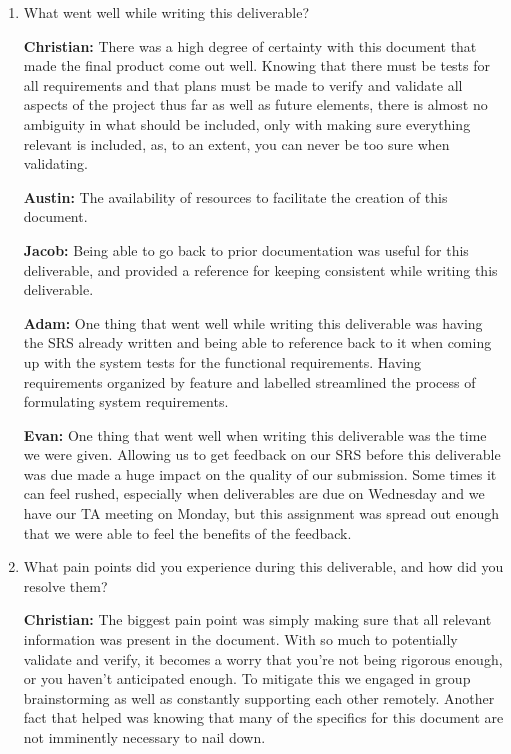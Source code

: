 \documentclass[12pt, titlepage]{article}
\begin{document}
\begin{enumerate}
  \item What went well while writing this deliverable? 

  \textbf{Christian:} There was a high degree of certainty with this document that made the final product come out well. Knowing that there must be tests for all requirements and that plans must be made to verify and validate all aspects of the project thus far as well as future elements, there is almost no ambiguity in what should be included, only with making sure everything relevant is included, as, to an extent, you can never be too sure when validating.
  
  \textbf{Austin:} The availability of resources to facilitate the creation of this document.
  
  \textbf{Jacob:} Being able to go back to prior documentation was useful for this deliverable, and provided a reference for keeping consistent while writing this deliverable.

  \textbf{Adam:} One thing that went well while writing this deliverable was having the SRS already written and being able to reference back to it when coming up with the system tests for the functional requirements. Having requirements organized by feature and labelled streamlined the process of formulating system requirements.

  \textbf{Evan: } One thing that went well when writing this deliverable was the time we were given. Allowing us to get feedback on our SRS before this deliverable was due made a huge impact on the quality of our submission. Some times it can feel rushed, especially when deliverables are due on Wednesday and we have our TA meeting on Monday, but this assignment was spread out enough that we were able to feel the benefits of the feedback.
  
  \item What pain points did you experience during this deliverable, and how
    did you resolve them?

  \textbf{Christian:} The biggest pain point was simply making sure that all relevant information was present in the document. With so much to potentially validate and verify, it becomes a worry that you're not being rigorous enough, or you haven't anticipated enough. To mitigate this we engaged in group brainstorming as well as constantly supporting each other remotely. Another fact that helped was knowing that many of the specifics for this document are not imminently necessary to nail down.
  

\end{enumerate}
\end{document}

